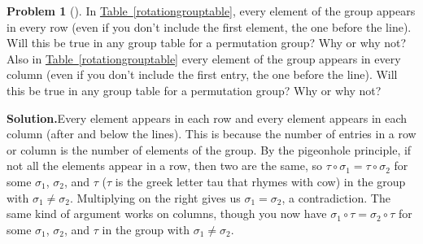 \documentclass[10pt,]{book}
\theoremstyle{plain}
\theoremstyle{definition}
\newtheorem{activity}[project]{Problem}
\theoremstyle{definition}
\numberwithin{equation}{chapter}
\begin{document}
\begin{activity}[]\label{activity-267}
In \hyperref[rotationgrouptable]{Table~\ref{rotationgrouptable}}, every element of the group appears in every row (even if you don't include the first element, the one before the line). Will this be true in any group table for a permutation group? Why or why not? Also in \hyperref[rotationgrouptable]{Table~\ref{rotationgrouptable}} every element of the group appears in every column (even if you don't include the first entry, the one before the line). Will this be true in any group table for a permutation group? Why or why not?%
\par\medskip\noindent%
\textbf{Solution.}\quad Every element appears in each row and every element appears in each column (after and below the lines). This is because the number of entries in a row or column is the number of elements of the group. By the pigeonhole principle, if not all the elements appear in a row, then two are the same, so \(\tau\circ \sigma_1 =\tau\circ\sigma_2\) for some \(\sigma_1\), \(\sigma_2\), and \(\tau\) (\(\tau\) is the greek letter tau that rhymes with cow) in the group with \(\sigma_1\not=
\sigma_2\). Multiplying on the right gives us \(\sigma_1 = \sigma_2\), a contradiction. The same kind of argument works on columns, though you now have \(\sigma_1\circ \tau =\sigma_2\circ \tau\) for some \(\sigma_1\), \(\sigma_2\), and \(\tau\) in the group with \(\sigma_1\not= \sigma_2\).%
\end{activity}
\end{document}
